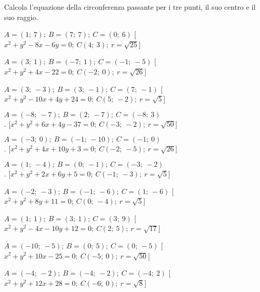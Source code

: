 \begin{esercizio}\label{ese:}
 Calcola l'equazione della circonferenza passante per i tre punti, il suo 
centro e il suo raggio.
 \begin{enumeratea}
  \item  \(A = \left (1;~7 \right );~B = \left (7;~7 \right );~C = \left (0;~6 
\right )\)
   \hfill [\(x^2 + y^2 -8x -6y  = 0;~C \left (4;~3 \right );~r = \sqrt{25}\)]
  \item  \(A = \left (3;~1 \right );~B = \left (-7;~1 \right );~C = \left 
(-1;~-5 \right )\)
   \hfill [\(x^2 + y^2 +4x -22 = 0;~C \left (-2;~0 \right );~r = \sqrt{26}\)]
  \item  \(A = \left (3;~-3 \right );~B = \left (3;~-1 \right );~C = \left 
(7;~-1 \right )\)
   \hfill [\(x^2 + y^2 -10x +4y +24 = 0;~C \left (5;~-2 \right );~r = 
\sqrt{5}\)]
  \item  \(A = \left (-8;~-7 \right );~B = \left (2;~-7 \right );~C = \left 
(-8;~3 \right )\)\\
   . \hfill [\(x^2 + y^2 +6x +4y -37 = 0;~C \left (-3;~-2 \right );~r = 
\sqrt{50}\)]
  \item  \(A = \left (-3;~0 \right );~B = \left (-1;~-10 \right );~C = \left 
(-1;~0 \right )\)\\
   . \hfill [\(x^2 + y^2 +4x +10y +3 = 0;~C \left (-2;~-5 \right );~r = 
\sqrt{26}\)]
  \item  \(A = \left (1;~-4 \right );~B = \left (0;~-1 \right );~C = \left 
(-3;~-2 \right )\)\\
   . \hfill [\(x^2 + y^2 +2x +6y +5 = 0;~C \left (-1;~-3 \right );~r = 
\sqrt{5}\)]
  \item  \(A = \left (-2;~-3 \right );~B = \left (-1;~-6 \right );~C = \left 
(1;~-6 \right )\)
   \hfill [\(x^2 + y^2 +8y +11 = 0;~C \left (0;~-4 \right );~r = \sqrt{5}\)]
  \item  \(A = \left (1;~1 \right );~B = \left (3;~1 \right );~C = \left (3;~9 
\right )\)
   \hfill [\(x^2 + y^2 -4x -10y +12 = 0;~C \left (2;~5 \right );~r = 
\sqrt{17}\)]
  \item  \(A = \left (-10;~-5 \right );~B = \left (0;~5 \right );~C = \left 
(0;~-5 \right )\)
   \hfill [\(x^2 + y^2 +10x -25 = 0;~C \left (-5;~0 \right );~r = \sqrt{50}\)]
  \item  \(A = \left (-4;~-2 \right );~B = \left (-4;~-2 \right );~C = \left 
(-4;~2 \right )\)
   \hfill [\(x^2 + y^2 +12x +28 = 0;~C \left (-6;~0 \right );~r = \sqrt{8}\)]
 \end{enumeratea}
\end{esercizio}


